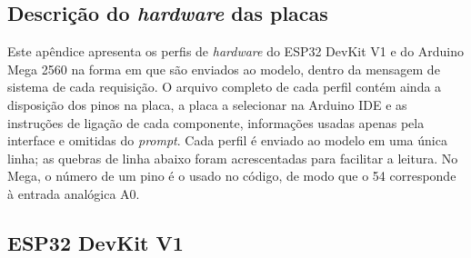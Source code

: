 
\begin{apendicesenv}

\chapter{Descrição do \textit{hardware} das placas}
\label{app:hardware-profile}

Este apêndice apresenta os perfis de \textit{hardware} do ESP32 DevKit V1 e do Arduino Mega 2560 na forma em que são enviados ao modelo, dentro da mensagem de sistema de cada requisição. O arquivo completo de cada perfil contém ainda a disposição dos pinos na placa, a placa a selecionar na Arduino IDE e as instruções de ligação de cada componente, informações usadas apenas pela interface e omitidas do \textit{prompt}. Cada perfil é enviado ao modelo em uma única linha; as quebras de linha abaixo foram acrescentadas para facilitar a leitura. No Mega, o número de um pino é o usado no código, de modo que o 54 corresponde à entrada analógica A0.

\section{ESP32 DevKit V1}


\end{apendicesenv}
